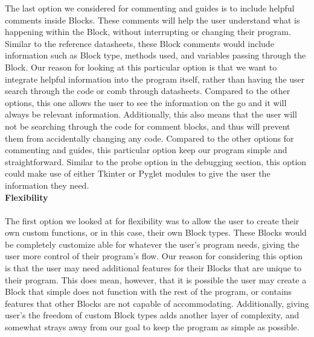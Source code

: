 \documentclass[journal,10pt,onecolumn,compsoc]{IEEEtran} \usepackage[margin=1.0in]{geometry} \usepackage{pdfpages} \usepackage{graphicx}
\begin{document}
\indent The last option we considered for commenting and guides is to include helpful comments inside Blocks. These comments will help the user understand what is happening within the Block, without interrupting or changing their program. Similar to the reference datasheets, these Block comments would include information such as Block type, methods used, and variables passing through the Block. Our reason for looking at this particular option is that we want to integrate helpful information into the program itself, rather than having the user search through the code or comb through datasheets. Compared to the other options, this one allows the user to see the information on the go and it will always be relevant information. Additionally, this also means that the user will not be searching through the code for comment blocks, and thus will prevent them from accidentally changing any code. Compared to the other options for commenting and guides, this particular option keep our program simple and straightforward. Similar to the probe option in the debugging section, this option could make use of either Tkinter or Pyglet modules to give the user the information they need.
\\
\newpage
\noindent \textbf{Flexibility}
\\
\\
\indent The first option we looked at for flexibility was to allow the user to create their own custom functions, or in this case, their own Block types. These Blocks would be completely customize able for whatever the user's program needs, giving the user more control of their program's flow. Our reason for considering this option is that the user may need additional features for their Blocks that are unique to their program. This does mean, however, that it is possible the user may create a Block that simple does not function with the rest of the program, or contains features that other Blocks are not capable of accommodating. Additionally, giving user's the freedom of custom Block types adds another layer of complexity, and somewhat strays away from our goal to keep the program as simple as possible.
\\
\\
\end{document}
